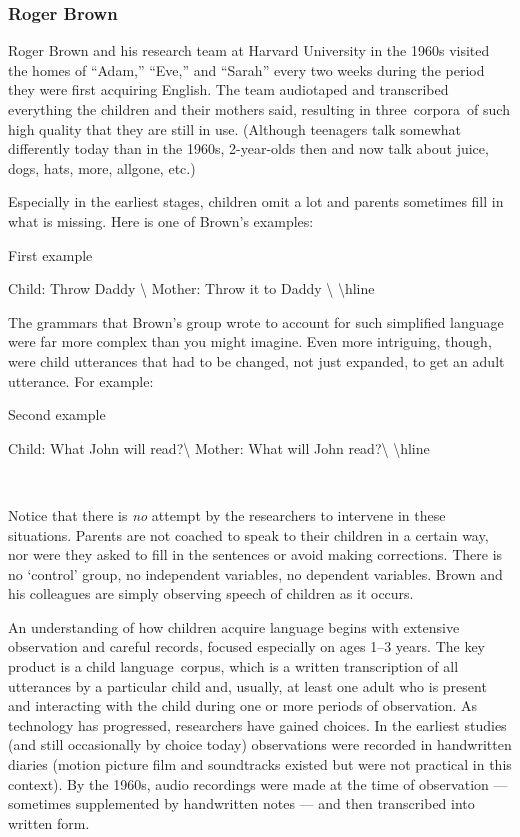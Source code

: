 \begin{refsection}
\subsubsection{Roger Brown}
\label{rogerbrown}

Roger Brown and his research team at Harvard University in the 1960s visited the homes of ``Adam,'' ``Eve,'' and ``Sarah'' every two weeks during the period they were first acquiring English. The team audiotaped and transcribed everything the children and their mothers said, resulting in three corpora of such high quality that they are still in use. (Although teenagers talk somewhat differently today than in the 1960s, 2-year-olds then and now talk about juice, dogs, hats, more, allgone, etc.) 

Especially in the earliest stages, children omit a lot and parents sometimes fill in what is missing. Here is one of Brown's examples:

\begin{apatextbox}{First example}

Child: Throw Daddy \textbackslash{} Mother: Throw it to Daddy \textbackslash{} \textbackslash{}hline
\end{apatextbox}
The grammars that Brown's group wrote to account for such simplified language were far more complex than you might imagine. Even more intriguing, though, were child utterances that had to be changed, not just expanded, to get an adult utterance. For example:

\begin{apatextbox}{Second example}

Child: What John will read?\textbackslash{} Mother: What will John read?\textbackslash{} \textbackslash{}hline
\end{apatextbox}~\citep{Brown:1968df}

Notice that there is \emph{no} attempt by the researchers to intervene in these situations. Parents are not coached to speak to their children in a certain way, nor were they asked to fill in the sentences or avoid making corrections. There is no `control' group, no independent variables, no dependent variables. Brown and his colleagues are simply observing speech of children as it occurs.

An understanding of how children acquire language begins with extensive observation and careful records, focused especially on ages 1--3 years. The key product is a child language corpus, which is a written transcription of all utterances by a particular child and, usually, at least one adult who is present and interacting with the child during one or more periods of observation. As technology has progressed, researchers have gained choices. In the earliest studies (and still occasionally by choice today) observations were recorded in handwritten diaries (motion picture film and soundtracks existed but were not practical in this context). By the 1960s, audio recordings were made at the time of observation --- sometimes supplemented by handwritten notes --- and then transcribed into written form. 


\end{refsection}
